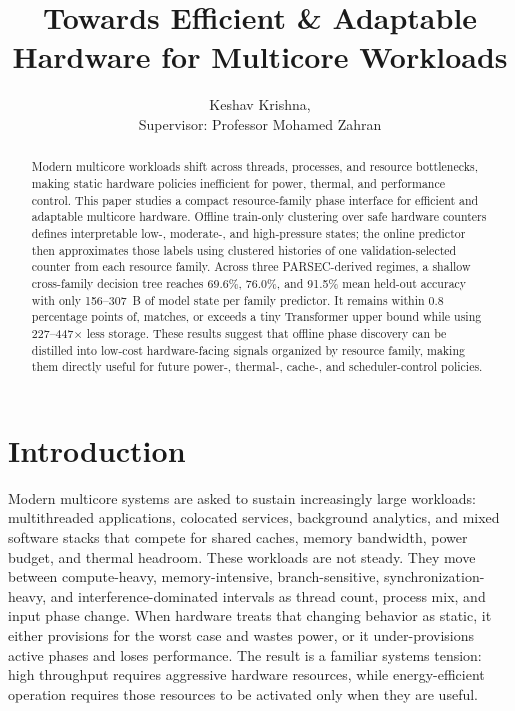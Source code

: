 \documentclass[10pt,twocolumn]{article}
\title{Towards Efficient \& Adaptable Hardware for Multicore Workloads}
\author{Keshav Krishna, \\Supervisor: Professor Mohamed Zahran}
\date{}
\begin{document}
\maketitle

\begin{abstract}
Modern multicore workloads shift across threads, processes, and resource bottlenecks, making static hardware policies inefficient for power, thermal, and performance control.
This paper studies a compact resource-family phase interface for efficient and adaptable multicore hardware.
Offline train-only clustering over safe hardware counters defines interpretable low-, moderate-, and high-pressure states; the online predictor then approximates those labels using clustered histories of one validation-selected counter from each resource family.
Across three PARSEC-derived regimes, a shallow cross-family decision tree reaches 69.6\%, 76.0\%, and 91.5\% mean held-out accuracy with only 156--307~B of model state per family predictor.
It remains within 0.8 percentage points of, matches, or exceeds a tiny Transformer upper bound while using 227--447$\times$ less storage.
These results suggest that offline phase discovery can be distilled into low-cost hardware-facing signals organized by resource family, making them directly useful for future power-, thermal-, cache-, and scheduler-control policies.
\end{abstract}

\section{Introduction}

Modern multicore systems are asked to sustain increasingly large workloads: multithreaded applications, colocated services, background analytics, and mixed software stacks that compete for shared caches, memory bandwidth, power budget, and thermal headroom.
These workloads are not steady.
They move between compute-heavy, memory-intensive, branch-sensitive, synchronization-heavy, and interference-dominated intervals as thread count, process mix, and input phase change.
When hardware treats that changing behavior as static, it either provisions for the worst case and wastes power, or it under-provisions active phases and loses performance.
The result is a familiar systems tension: high throughput requires aggressive hardware resources, while energy-efficient operation requires those resources to be activated only when they are useful.
\end{document}
